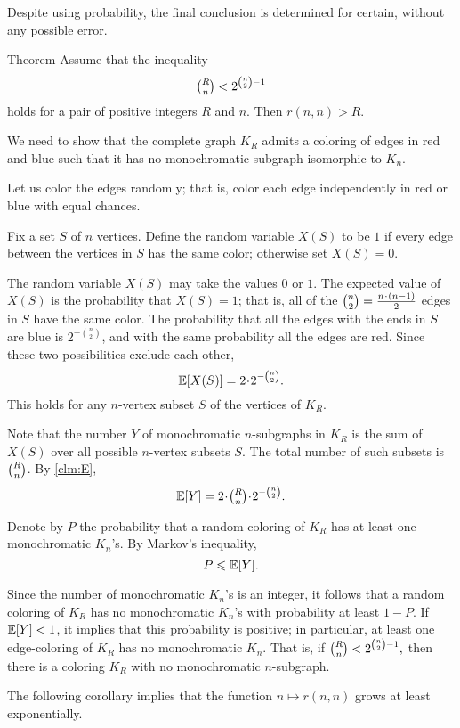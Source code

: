 Despite using probability, the final conclusion is determined for certain, without any possible error.


\medskip

\begin{thm}{Theorem}\label{thm:ramsey-lower}
Assume that the inequality 
\[\tbinom R n < 2^{{\binom n 2} - 1}\]
holds for a pair of positive integers $R$ and $n$.
Then $r(n,n)>R$.
\end{thm}

We need to show that the complete graph $K_R$
admits a coloring of edges in red and blue such that it has no monochromatic subgraph isomorphic to $K_n$.

Let us color the edges randomly;
that is, color each edge independently in red or blue with equal chances.

Fix a set $S$ of $n$ vertices. 
Define the random variable $X(S)$ to be $1$ if every edge between the vertices in $S$ has the same color; otherwise set $X(S)=0$.

The random variable $X(S)$ may take the values $0$ or $1$.
The expected value of $X(S)$ is the probability that $X(S)=1$;
that is, all of the $\tbinom n 2=\tfrac{n\cdot(n-1)}{2}$
edges in $S$ have the same color. 
The probability that all the edges with the ends in $S$ are blue is ${2^{-\binom n 2}}$, and with the same probability all the edges are red.
Since these two possibilities exclude each other, 
\[\EE[X(S)]={2}\cdot {2^{-\binom n 2}}.\]
This holds for any $n$-vertex subset $S$ of the vertices of $K_R$.

Note that the number $Y$ of monochromatic $n$-subgraphs in $K_R$ is the sum of $X(S)$ over all possible $n$-vertex subsets $S$. 
The total number of such subsets is $\tbinom R n$.
By \ref{clm:E}, 
\[\EE[Y]=2\cdot \tbinom R n\cdot 2^{-\binom n 2}.\]

Denote by $P$ the probability that a random coloring of $K_R$ has at least one monochromatic $K_n$'s.
By Markov's inequality, 
\[P\leqslant \mathbb{E}[Y].\]

Since the number of monochromatic $K_n$'s is an integer, it follows that 
a random coloring of $K_R$ has no monochromatic $K_n$'s with probability at least $1-P$.
If $\mathbb{E}[Y]<1$, it implies that this probability is positive;
in particular, at least one edge-coloring of $K_R$ has no monochromatic $K_n$. 
That is, if
$\tbinom R n < 2^{\binom n 2 - 1},$
then there is a coloring $K_R$ with no monochromatic $n$-subgraph.
\qeds

The following corollary implies that the function $n\mapsto r(n,n)$ grows at least exponentially. 

